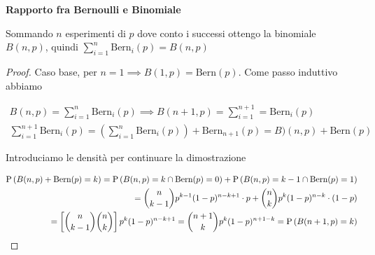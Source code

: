 \begin{thm}
    \textbf{Rapporto fra Bernoulli e Binomiale}
    
    Sommando $ n $ esperimenti di $ p $ dove conto i successi ottengo la binomiale $ B(n,p) $, quindi $ \sum_{i=1}^{n} \text{Bern}_i(p) = B(n,p) $
    
    \begin{proof}
        Caso base, per $ n = 1 \implies B(1,p) = \text{Bern}(p)$. Come passo induttivo abbiamo 
        
        \begin{equation*}
        \begin{aligned}
        B(n,p) = \sum_{i=1}^{n} \text{Bern}_i(p) \implies B(n+1,p) = \sum_{i=1}^{n+1} = \text{Bern}_i(p) \\
        \sum_{i=1}^{n+1} \text{Bern}_i(p) = \left( \sum_{i=1}^{n} \text{Bern}_i(p) \right) + \text{Bern}_{n+1}(p) = B)(n,p) + \text{Bern}(p)
        \end{aligned}
        \end{equation*}
        
        Introduciamo le densità per continuare la dimostrazione
        
        \begin{equation*}
        \begin{aligned}
        \text{P}\left(B(n,p) + \text{Bern}(p) = k\right) = \text{P}\left(B(n,p) = k \cap \text{Bern}(p) = 0\right) + \text{P}\left(B(n,p) = k-1 \cap \text{Bern}(p) = 1\right) \\
        = \binom{n}{k-1}p^{k-1}(1-p)^{n-k+1} \cdot p + \binom{n}{k}p^k(1-p)^{n-k} \cdot  (1-p) \\
        = \left[\binom{n}{k-1}\binom{n}{k}\right] p^k (1-p)^{n-k+1} = \binom{n+1}{k} p^k (1-p)^{n+1-k} = \text{P}\left(B(n+1,p) = k\right)
        \end{aligned}
        \end{equation*}
    \end{proof}


\end{thm}


